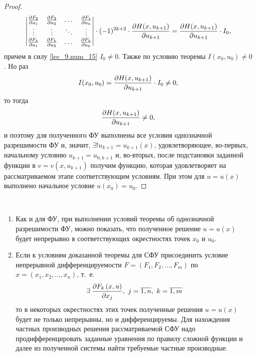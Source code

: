 \documentclass[../../main.tex]{subfiles}
\begin{document}
\begin{proof}
\begin{gather*}
\begin{vmatrix}
     \frac{\partial F_2}{\partial u_1} & \frac{\partial F_2}{\partial u_2} & \dots & \frac{\partial F_1}{\partial u_k}\\
     \vdots & \vdots & \ddots & \vdots \\
     \frac{\partial F_{k}}{\partial u_1} & \frac{\partial F_{k}}{\partial u_2} & \dots & \frac{\partial F_{k}}{\partial u_k} \\
    \end{vmatrix} \cdot (-1)^{2k+2} \cdot \frac{\partial H(x, u_{k+1})}{\partial u_{k+1}} = 
    \frac{\partial H(x, u_{k+1})}{\partial u_{k+1}} \cdot I_0,
    \end{gather*}
    причем в силу \eqref{lec_9.num_15} $I_0 \ne 0$. Также по условию теоремы 
    $I(x_0, u_0) \ne 0$. Но раз \[I(x_0, u_0) = 
    \frac{\partial H(x, u_{k+1})}{\partial u_{k+1}} \cdot I_0 \ne 0,\]
    то тогда \[\frac{\partial H(x, u_{k+1})}{\partial u_{k+1}} \ne 0,\]
    и поэтому для полученного ФУ выполнены все условия 
    однозначной разрешимости ФУ и, значит, 
    $\exists! u_{k+1} = u_{k+1}\left(x\right)$, 
    удовлетворяющее, во-первых, начальному условию
    $u_{k+1} = u_{0,k+1}$ и, во-вторых, после подстановки
    заданной функции в
    $v = v\left(x, u_{k+1}\right)$ получим функцию,
    которая удовлетворяет на рассматриваемом этапе
    соответствующим условиям.
    При этом для $u = u\left(x\right)$ выполнено начальное
    условие $u\left(x_0\right) = u_0$.
\end{proof}

\begin{rems}

~

    \begin{enumerate}
        \item Как и для ФУ, при выполнении условий 
        теоремы об однозначной разрешимости ФУ, можно показать,
        что полученное решение $u = u\left(x\right)$
        будет непрерывно в соответствующих окрестностях
        точек $x_0$ и $u_0$.
        \item Если к условиям доказанной теоремы для
        СФУ присоединить условие непрерывной 
        дифференцируемости
        $F = \left(F_1, F_2, \dots, F_m\right)$ по
        $x = \left(x_1, x_2, \dots, x_n\right)$, т.~е. 
        \[\exists\:
        \pderiv{F_k\left(x, u\right)}{x_j},\ 
        j = \overline{1, n},\ k = \overline{1, m}\] то в некоторых окрестностях
        этих точек полученные решения 
        $u = u\left(x\right)$ будет не только 
        непрерывны, но и дифференцируемы.
        Для нахождения частных производных решения
        рассматриваемой СФУ надо продифференцировать
        заданные уравнения по правилу сложной функции и
        далее из полученной системы найти требуемые частные производные. 
    \end{enumerate}
\end{rems}
\end{document}
